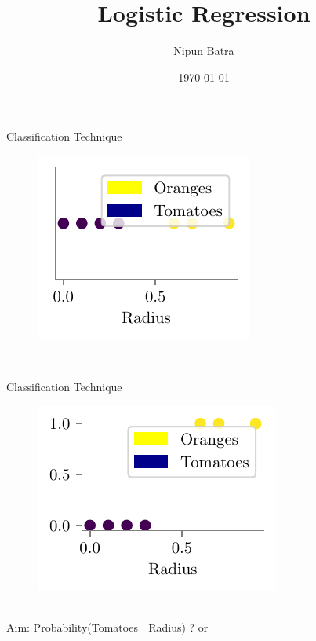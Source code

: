\documentclass{beamer}
\title{Logistic Regression}
\date{\today}
\author{Nipun Batra}
\institute{IIT Gandhinagar}
\begin{document}
	\maketitle
	
	\begin{frame}{Classification Technique}
	\begin{minipage}{0.3\textwidth}
		
		\begin{figure}
			
			\includegraphics{../figures/logistic-regression/logistic-orange-tomatoes-original.pdf}
		\end{figure}
	\end{minipage} \\

	
\end{frame}
	
	\begin{frame}{Classification Technique}
	\begin{minipage}{0.3\textwidth}
		
		\begin{figure}
			
			\includegraphics{../figures/logistic-regression/logistic-orange-tomatoes.pdf}
		\end{figure}
	\end{minipage} \\
	\pause Aim: Probability(Tomatoes $|$ Radius) ? or
	\pause {}
	
\end{frame}
\end{document}
